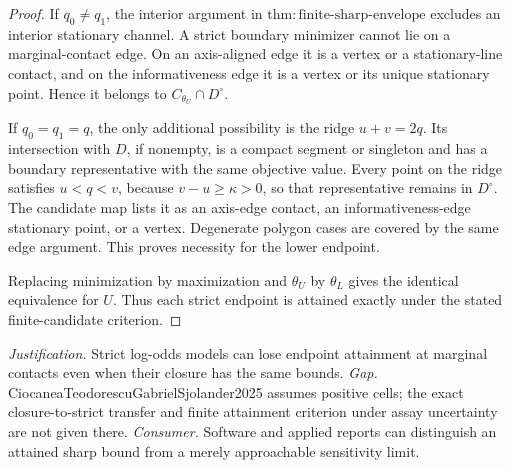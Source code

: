 \documentclass{article}
\begin{document}
\begin{proof}
If \(q_0\neq q_1\), the interior argument in \(\mathrm{thm:finite\text{-}sharp\text{-}envelope}\) excludes an interior stationary channel. A strict boundary minimizer cannot lie on a marginal-contact edge. On an axis-aligned edge it is a vertex or a stationary-line contact, and on the informativeness edge it is a vertex or its unique stationary point. Hence it belongs to \(C_{\theta_U}\cap D^\circ\).

If \(q_0=q_1=q\), the only additional possibility is the ridge \(u+v=2q\). Its intersection with \(D\), if nonempty, is a compact segment or singleton and has a boundary representative with the same objective value. Every point on the ridge satisfies \(u<q<v\), because \(v-u\geq\kappa>0\), so that representative remains in \(D^\circ\). The candidate map lists it as an axis-edge contact, an informativeness-edge stationary point, or a vertex. Degenerate polygon cases are covered by the same edge argument. This proves necessity for the lower endpoint.

Replacing minimization by maximization and \(\theta_U\) by \(\theta_L\) gives the identical equivalence for \(U\). Thus each strict endpoint is attained exactly under the stated finite-candidate criterion.
\end{proof}
\par\smallskip\noindent \textit{Justification.} Strict log-odds models can lose endpoint attainment at marginal contacts even when their closure has the same bounds. \textit{Gap.} CiocaneaTeodorescuGabrielSjolander2025 assumes positive cells; the exact closure-to-strict transfer and finite attainment criterion under assay uncertainty are not given there. \textit{Consumer.} Software and applied reports can distinguish an attained sharp bound from a merely approachable sensitivity limit.
\end{document}
